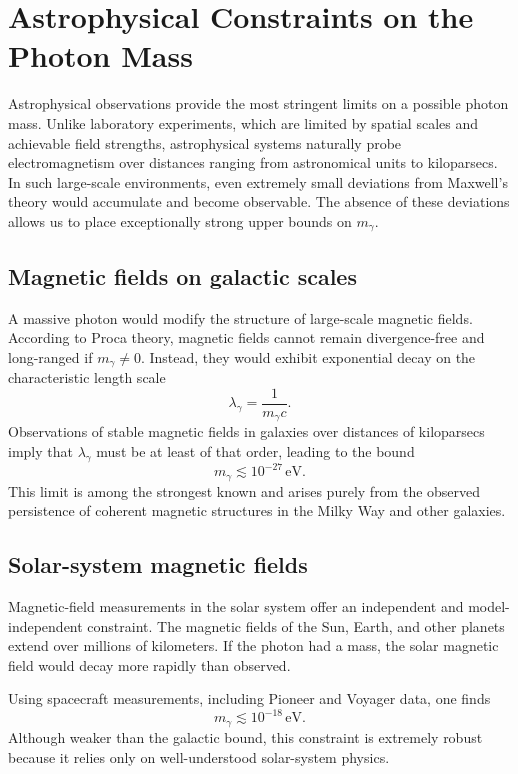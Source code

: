 \section{Astrophysical Constraints on the Photon Mass}

Astrophysical observations provide the most stringent limits on a possible 
photon mass. Unlike laboratory experiments, which are limited by spatial 
scales and achievable field strengths, astrophysical systems naturally probe 
electromagnetism over distances ranging from astronomical units to 
kiloparsecs. In such large-scale environments, even extremely small 
deviations from Maxwell’s theory would accumulate and become observable. 
The absence of these deviations allows us to place exceptionally strong 
upper bounds on $m_\gamma$.

\subsection*{Magnetic fields on galactic scales}

A massive photon would modify the structure of large-scale magnetic fields. 
According to Proca theory, magnetic fields cannot remain divergence-free and 
long-ranged if $m_\gamma \neq 0$. Instead, they would exhibit exponential 
decay on the characteristic length scale
\[
\lambda_\gamma = \frac{1}{m_\gamma c}.
\]
Observations of stable magnetic fields in galaxies over distances of 
kiloparsecs imply that $\lambda_\gamma$ must be at least of that order, 
leading to the bound
\[
m_\gamma \lesssim 10^{-27} \,\text{eV}.
\]
This limit is among the strongest known and arises purely from the observed 
persistence of coherent magnetic structures in the Milky Way and other 
galaxies.

\subsection*{Solar-system magnetic fields}

Magnetic-field measurements in the solar system offer an independent and 
model-independent constraint. The magnetic fields of the Sun, Earth, and 
other planets extend over millions of kilometers. If the photon had a mass, 
the solar magnetic field would decay more rapidly than observed.

Using spacecraft measurements, including Pioneer and Voyager data, one finds
\[
m_\gamma \lesssim 10^{-18} \,\text{eV}.
\]
Although weaker than the galactic bound, this constraint is extremely robust 
because it relies only on well-understood solar-system physics.

